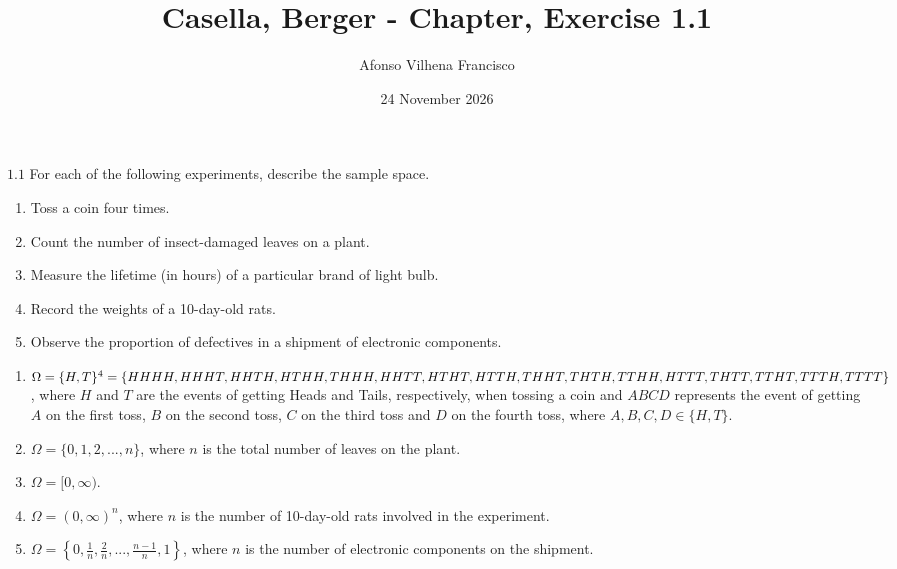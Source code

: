 \documentclass{article}
\title{Casella, Berger - Chapter, Exercise 1.1}
\author{Afonso Vilhena Francisco}
\date{24 November 2026}
\begin{document}
\maketitle

$\mathbf{1.1}$ For each of the following experiments, describe the sample space.
\begin{enumerate}[label=(\alph*)]
    \item Toss a coin four times.
    \item Count the number of insect-damaged leaves on a plant.
    \item Measure the lifetime (in hours) of a particular brand of light bulb.
    \item Record the weights of a 10-day-old rats.
    \item Observe the proportion of defectives in a shipment of electronic components.
\end{enumerate}

\vspace{0.5cm}

\begin{enumerate}[label=(\alph*)]
    \item $\Omega = \{H,T\}^4 = \{HHHH, HHHT, HHTH, HTHH, THHH, HHTT,\\ HTHT, HTTH, THHT, THTH,TTHH, HTTT,THTT,TTHT,TTTH,\\TTTT\}$, where $H$ and $T$ are the events of getting Heads and Tails, respectively, when tossing a coin and $ABCD$ represents the event of getting $A$ on the first toss, $B$ on the second toss, $C$ on the third toss and $D$ on the fourth toss, where $A,B,C,D \in \{H,T\}$.
    \item $\Omega = \{0,1,2,...,n\}$, where $n$ is the total number of leaves on the plant.
    \item $\Omega = [0,\infty)$.
    \item $\Omega = (0,\infty)^n$, where $n$ is the number of 10-day-old rats involved in the experiment.
    \item $\Omega=\left\{0, \frac{1}{n}, \frac{2}{n}, ..., \frac{n-1}{n}, 1 \right\}$, where $n$ is the number of electronic components on the shipment.
\end{enumerate}
\end{document}
